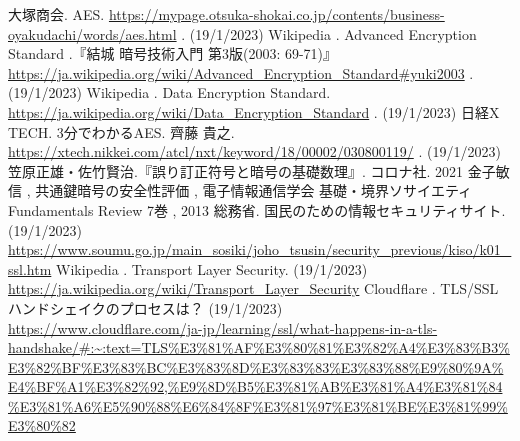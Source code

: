 \documentclass[dvipdfmx,autodetect-engine,titlepage]{jsarticle}
\begin{document}
\begin{thebibliography}{99}
    大塚商会. AES. 
      \url{https://mypage.otsuka-shokai.co.jp/contents/business-oyakudachi/words/aes.html} . (19/1/2023)
    Wikipedia . Advanced Encryption Standard .『結城 暗号技術入門 第3版(2003: 69-71)』\\
      \url{https://ja.wikipedia.org/wiki/Advanced_Encryption_Standard#yuki2003} . (19/1/2023)
    Wikipedia . Data Encryption Standard.\\
      \url{https://ja.wikipedia.org/wiki/Data_Encryption_Standard} . (19/1/2023)
    日経X TECH. 3分でわかるAES. 齊藤 貴之. \\
      \url{https://xtech.nikkei.com/atcl/nxt/keyword/18/00002/030800119/} . (19/1/2023)
    笠原正雄・佐竹賢治.『誤り訂正符号と暗号の基礎数理』. コロナ社. 2021
    金子敏信 , 共通鍵暗号の安全性評価 , 電子情報通信学会 基礎・境界ソサイエティ Fundamentals Review 7巻 , 2013
    総務省. 国民のための情報セキュリティサイト.(19/1/2023) \\
      \url{https://www.soumu.go.jp/main_sosiki/joho_tsusin/security_previous/kiso/k01_ssl.htm} 
    Wikipedia . Transport Layer Security. (19/1/2023)\\
      \url{https://ja.wikipedia.org/wiki/Transport_Layer_Security} 
    Cloudflare . TLS/SSLハンドシェイクのプロセスは？ (19/1/2023)\\
      \url{https://www.cloudflare.com/ja-jp/learning/ssl/what-happens-in-a-tls-handshake/#:~:text=TLS%E3%81%AF%E3%80%81%E3%82%A4%E3%83%B3%E3%82%BF%E3%83%BC%E3%83%8D%E3%83%83%E3%83%88%E9%80%9A%E4%BF%A1%E3%82%92,%E9%8D%B5%E3%81%AB%E3%81%A4%E3%81%84%E3%81%A6%E5%90%88%E6%84%8F%E3%81%97%E3%81%BE%E3%81%99%E3%80%82} 

\end{thebibliography}
\end{document}
